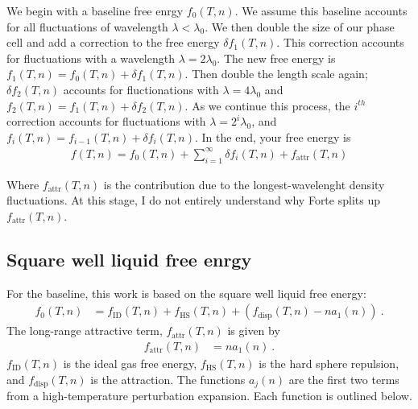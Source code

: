 \documentclass[letterpaper,twocolumn,amsmath,amssymb,prb]{revtex4-1}
\newcommand{\kT}{k_BT}
\newcommand{\fid}{f_\text{ID}(T,n)}
\newcommand{\fhs}{f_\text{HS}(T,n)}
\newcommand{\fdisp}{f_\text{disp}(T,n)}
\newcommand{\fattr}{f_\text{attr}(T,n)}
\newcommand{\fixme}[1]{\textcolor{red}{\textbf{[#1]}}}
\begin{document}
We begin with a baseline free enrgy $f_0(T,n)$. We assume this baseline accounts for all fluctuations of wavelength $\lambda < \lambda_0$. We then double the size of our phase cell and add a correction to the free energy $\delta f_1(T,n)$. This correction accounts for fluctuations with a wavelength $\lambda = 2\lambda_0$. The new free energy is $f_1(T,n) = f_0(T,n) + \delta f_1(T,n)$. Then double the length scale again; $\delta f_2(T,n)$ accounts for fluctionations with $\lambda = 4\lambda_0$ and $f_2(T,n) = f_1(T,n) + \delta f_2(T,n)$. As we continue this process, the $i^{th}$ correction accounts for fluctuations with $\lambda = 2^i\lambda_0$, and $f_i(T,n) = f_{i-1}(T,n) + \delta f_i(T,n)$. In the end, your free energy is
\begin{align}
  f(T,n) = f_0(T,n) + \sum_{i=1}^\infty\delta f_i(T,n) + \fattr
\end{align}

Where $\fattr$ is the contribution due to the longest-wavelenght density fluctuations. At this stage, I do not entirely understand why Forte splits up $\fattr$.



\subsection{Square well liquid free enrgy}\label{subsec:SW}
For the baseline, this work is based on the square well liquid free energy\cite{Hughes13}:
\begin{align}
  f_0(T,n) &= \fid + \fhs + \left( \fdisp - n a_1(n) \right) \ .
\end{align}
The long-range attractive term, $\fattr$ is given by
\begin{align}
  \fattr &= n a_1(n) \ .
\end{align}
$\fid$ is the ideal gas free energy, $\fhs$ is the hard sphere repulsion, and $\fdisp$ is the attraction. The functions $a_j(n)$ are the first two terms from a high-temperature perturbation expansion. Each function is outlined below.
\end{document}
